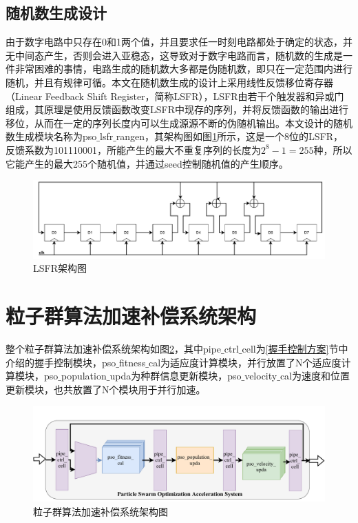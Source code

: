 \subsection{随机数生成设计}
由于数字电路中只存在0和1两个值，并且要求任一时刻电路都处于确定的状态，并无中间态产生，否则会进入亚稳态，这导致对于数字电路而言，随机数的生成是一件非常困难的事情，电路生成的随机数大多都是伪随机数，即只在一定范围内进行随机，并且有规律可循。本文在随机数生成的设计上采用线性反馈移位寄存器（Linear Feedback Shift Register，简称LSFR），LSFR由若干个触发器和异或门组成，其原理是使用反馈函数改变LSFR中现存的序列，并将反馈函数的输出进行移位，从而在一定的序列长度内可以生成源源不断的伪随机输出。本文设计的随机数生成模块名称为pso$\_$lsfr$\_$rangen，其架构图如图\ref{fig:LSFR架构图}所示，这是一个8位的LSFR，反馈系数为101110001，所能产生的最大不重复序列的长度为$2^8-1=255$种，所以它能产生的最大255个随机值，并通过seed控制随机值的产生顺序。
\begin{figure}[htb]
    \centering
    \includegraphics[width=14cm]{fig/5-fig/LSFR架构图.pdf}
    \caption{LSFR架构图}
    \label{fig:LSFR架构图}
\end{figure}

\section{粒子群算法加速补偿系统架构}
整个粒子群算法加速补偿系统架构如图\ref{fig:粒子群算法加速补偿系统架构示意图}，其中pipe$\_$ctrl$\_$cell为\ref{握手控制方案}节中介绍的握手控制模块，pso$\_$fitness$\_$cal为适应度计算模块，并行放置了N个适应度计算模块，pso$\_$population$\_$upda为种群信息更新模块，pso$\_$velocity$\_$cal为速度和位置更新模块，也共放置了N个模块用于并行加速。

\begin{figure}[htb]
    \centering
    \includegraphics[width=14cm]{fig/5-fig/粒子群算法加速系统架构.drawio.pdf}
    \caption{粒子群算法加速补偿系统架构图}
    \label{fig:粒子群算法加速补偿系统架构示意图}
\end{figure}

